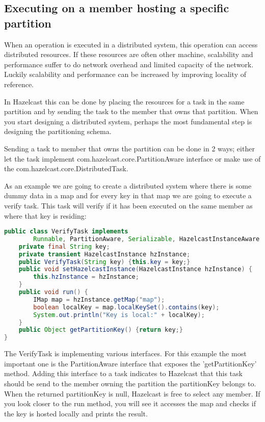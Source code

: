 \subsection{Executing on a member hosting a specific partition}
When an operation is executed in a distributed system, this operation can access distributed resources. If these resources are often other machine, scalability and performance suffer to do network overhead and limited capacity of the network. Luckily scalability and performance can be increased by improving locality of reference.

In Hazelcast this can be done by placing the resources for a task in the same partition and by sending the task to the member that owns that partition. When you start designing a distributed system, perhaps the most fundamental step is designing the partitioning schema.

Sending a task to member that owns the partition can be done in 2 ways; either let the task implement com.hazelcast.core.PartitionAware interface or make use of the com.hazelcast.core.DistributedTask.

As an example we are going to create a distributed system where there is some dummy data in a map and for every key in that map we are going to execute a verify task. This task will verify if it has been executed on the same member as where that key is residing:
\begin{lstlisting}[language=java]
public class VerifyTask implements
        Runnable, PartitionAware, Serializable, HazelcastInstanceAware {
    private final String key;
    private transient HazelcastInstance hzInstance;
    public VerifyTask(String key) {this.key = key;}
    public void setHazelcastInstance(HazelcastInstance hzInstance) {
        this.hzInstance = hzInstance;
    }
    public void run() {
        IMap map = hzInstance.getMap("map");
        boolean localKey = map.localKeySet().contains(key);
        System.out.println("Key is local:" + localKey);
    }
    public Object getPartitionKey() {return key;}
}
\end{lstlisting}
The VerifyTask is implementing various interfaces. For this example the most important one is the PartitionAware interface that exposes the 'getPartitionKey' method. Adding this interface to a task indicates to Hazelcast that this task should be send to the member owning the partition the partitionKey belongs to. When the returned partitionKey is null, Hazelcast is free to select any member. If you look closer to the run method, you will see it accesses the map and checks if the key is hosted locally and prints the result.

